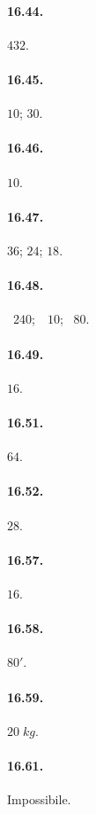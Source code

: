 \begin{multicols}{2}
\paragraph{16.44.}
$432$.

\paragraph{16.45.}
$10$; $30$.

\paragraph{16.46.}
$10$.

\paragraph{16.47.}
$36$; $24$; $18$.

\paragraph{16.48.}
\officialeuro~$240$;~\officialeuro~$10$; \officialeuro~$80$.

\paragraph{16.49.}
$16$.

\paragraph{16.51.}
$64$.

\paragraph{16.52.}
$28$.

\paragraph{16.57.}
$16$.

\paragraph{16.58.}
$80'$.

\paragraph{16.59.}
$20\;\unit{kg}$.

\paragraph{16.61.}
Impossibile.


\end{multicols}
